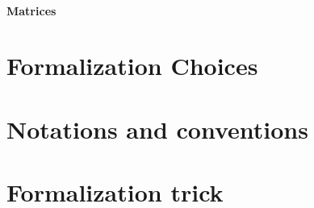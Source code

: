 \paragraph{Matrices}

\section{Formalization Choices}

\section{Notations and conventions}

\section{Formalization trick}


